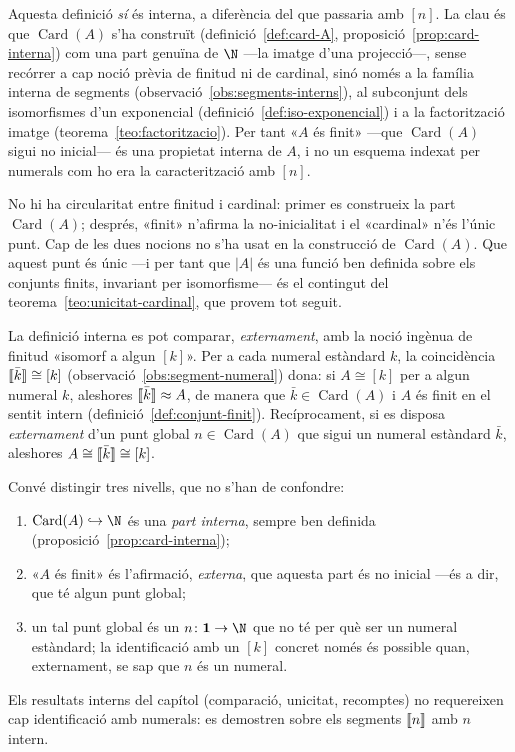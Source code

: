 \begin{observacio}\label{obs:finitud-propietat}
Aquesta definició \emph{sí} és interna, a diferència del que passaria amb
\([n]\). La clau és que \(\operatorname{Card}(A)\) s'ha construït
(definició~\ref{def:card-A}, proposició~\ref{prop:card-interna}) com una
part genuïna de \(\N\) ---la imatge d'una projecció---, sense recórrer a
cap noció prèvia de finitud ni de cardinal, sinó només a la família interna
de segments (observació~\ref{obs:segments-interns}), al subconjunt dels
isomorfismes d'un exponencial (definició~\ref{def:iso-exponencial}) i a la
factorització imatge (teorema~\ref{teo:factoritzacio}). Per tant «\(A\) és
finit» ---que \(\operatorname{Card}(A)\) sigui no inicial--- és una
propietat interna de \(A\), i no un esquema indexat per numerals com ho era
la caracterització amb \([n]\).

No hi ha circularitat entre finitud i cardinal: primer es construeix la
part \(\operatorname{Card}(A)\); després, «finit» n'afirma la no-inicialitat
i el «cardinal» n'és l'únic punt. Cap de les dues nocions no s'ha usat en
la construcció de \(\operatorname{Card}(A)\). Que aquest punt és únic ---i
per tant que \(|A|\) és una funció ben definida sobre els conjunts finits,
invariant per isomorfisme--- és el contingut del
teorema~\ref{teo:unicitat-cardinal}, que provem tot seguit.
\end{observacio}

\begin{observacio}\label{obs:finitud-equivalencia}
La definició interna es pot comparar, \emph{externament}, amb la noció
ingènua de finitud «isomorf a algun \([k]\)». Per a cada numeral estàndard
\(k\), la coincidència \(\llbracket \bar k\rrbracket\cong[k]\)
(observació~\ref{obs:segment-numeral}) dona: si \(A\cong[k]\) per a algun
numeral \(k\), aleshores \(\llbracket \bar k\rrbracket\approx A\), de manera que
\(\bar k\in\operatorname{Card}(A)\) i \(A\) és finit en el sentit intern
(definició~\ref{def:conjunt-finit}). Recíprocament, si es disposa
\emph{externament} d'un punt global \(n\in\operatorname{Card}(A)\) que
sigui un numeral estàndard \(\bar k\), aleshores \(A\cong\llbracket \bar
k\rrbracket\cong[k]\).

Convé distingir tres nivells, que no s'han de confondre:
\begin{enumerate}
\item \(\operatorname{Card}(A)\hookrightarrow\N\) és una \emph{part
interna}, sempre ben definida (proposició~\ref{prop:card-interna});
\item «\(A\) és finit» és l'afirmació, \emph{externa}, que aquesta part és
no inicial ---és a dir, que té algun punt global;
\item un tal punt global és un \(n\colon\mathbf1\to\N\) que no té per què
ser un numeral estàndard; la identificació amb un \([k]\) concret només és
possible quan, externament, se sap que \(n\) és un numeral.
\end{enumerate}
Els resultats interns del capítol (comparació, unicitat, recomptes) no
requereixen cap identificació amb numerals: es demostren sobre els segments
\(\llbracket n\rrbracket\) amb \(n\) intern.
\end{observacio}

